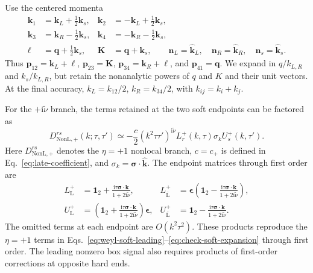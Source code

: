 \documentclass[a4paper,12pt]{article}
\newcommand{\ii}{\mathrm i}
\newcommand{\mb}{\mathbf}
\newcommand{\tn}{\tilde\nu}
\newcommand{\NL}{\mathrm{NonL}}
\newcommand{\bq}{\mb q}
\newcommand{\bk}{\mb k}
\newcommand{\bs}{\bm\sigma}
\newcommand{\one}{\mathbf1_2}
\newcommand{\epsmat}{\boldsymbol{\epsilon}}
\begin{document}
Use the centered momenta
\begin{align}
 \bk_1&=\mb k_L+\tfrac12\bk_s,&\bk_2&=-\mb k_L+\tfrac12\bk_s,\nonumber\\
 \bk_3&=\mb k_R-\tfrac12\bk_s,&\bk_4&=-\mb k_R-\tfrac12\bk_s,\nonumber\\
 \bm\ell&=\bq+\tfrac12\bk_s,&\mb K&=\bq+\bk_s,\qquad
 \mb n_L=\widehat{\mb k}_L,\quad\mb n_R=\widehat{\mb k}_R,\quad\mb n_s=\widehat{\bk}_s.
 \label{eq:central}
\end{align}
Thus $\mb p_{12}=\mb k_L+\bm\ell$, $\mb p_{23}=\mb K$,
$\mb p_{34}=\mb k_R+\bm\ell$, and $\mb p_{41}=\bq$.
We expand in $q/k_{L,R}$ and $k_s/k_{L,R}$, but retain the nonanalytic
powers of $q$ and $K$ and their unit vectors. At the final accuracy,
$k_L=k_{12}/2$, $k_R=k_{34}/2$, with $k_{ij}=k_i+k_j$.

For the $+\ii\tn$ branch, the terms retained at the two soft
endpoints can be factored as
\begin{equation}
 D^{rs}_{\NL,+}(k;\tau,\tau')
 \simeq-\frac c2(k^2\tau\tau')^{\ii\tn}
 L_r^+(k,\tau)\sigma_k U_s^+(k,\tau').
 \label{eq:soft-factored}
\end{equation}
Here $D^{rs}_{\NL,+}$ denotes the $\eta=+1$ nonlocal branch,
$c=c_+$ is defined in Eq.~\eqref{eq:late-coefficient}, and
$\sigma_k=\bs\cdot\widehat{\bk}$. The endpoint matrices through first order are
\begin{align}
 L_{\mathrm L}^+&=\one+\frac{\ii\tau\bs\cdot\bk}{1+2\ii\tn},&
 L_{\overline{\mathrm L}}^+&=\epsmat
 \left(\one-\frac{\ii\tau\bs\cdot\bk}{1+2\ii\tn}\right),\nonumber\\
 U_{\mathrm L}^+&=\left(\one+\frac{\ii\tau\bs\cdot\bk}{1+2\ii\tn}\right)\epsmat,&
 U_{\overline{\mathrm L}}^+&=\one-\frac{\ii\tau\bs\cdot\bk}{1+2\ii\tn}.
 \label{eq:soft-endpoints-first}
\end{align}
The omitted terms at each endpoint are $O(k^2\tau^2)$.
These products reproduce the $\eta=+1$ terms in
Eqs.~\eqref{eq:weyl-soft-leading}--\eqref{eq:check-soft-expansion}
through first order. The leading nonzero box signal also requires
products of first-order corrections at opposite hard ends.
\end{document}
